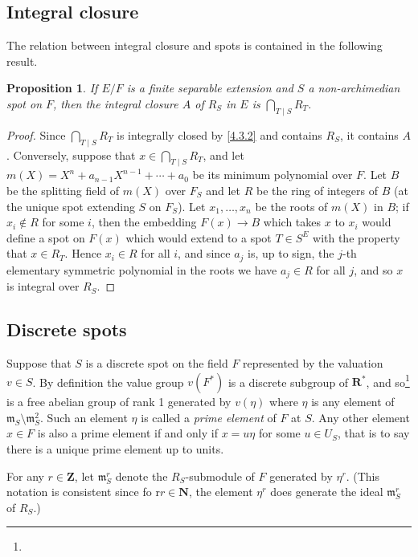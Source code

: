 \documentclass[10pt,leqno]{article}
\newtheorem{prop}[theo]{Proposition}
\theoremstyle{definition}
\def\NN{\mathbf{N}}
\def\ZZ{\mathbf{Z}}
\def\RR{\mathbf{R}}
\def\mm{\mathfrak{m}}
\def\fnfofi{}
\begin{document}
\subsection{Integral closure}
\label{ch:4.4}

The relation between integral closure and spots is contained in the following result.


\begin{prop}
\label{4.4.1}
If $E/F$ is a finite separable extension and $S$ a non-archi\-median spot on $F$, then the integral closure $A$ of $R_S$ in $E$ is $\bigcap_{T \mid S} R_T$.
\end{prop}

\begin{proof}
Since $\bigcap_{T \mid S} R_T$ is integrally closed by \ref{4.3.2} and contains $R_S$, it contains $A$.
Conversely, suppose that $x \in \bigcap_{T \mid S} R_T$, and let $m(X) = X^n + a_{n-1} X^{n-1} + \cdots + a_0$ be its minimum polynomial over $F$.
Let $B$ be the splitting field of $m(X)$ over $F_S$ and let $R$ be the ring of integers of $B$ (at the unique spot extending $S$ on $F_S$).
Let $x_1, \ldots, x_n$ be the roots of $m(X)$ in $B$; if $x_i \not\in R$ for some $i$, then the embedding $F(x) \to B$ which takes $x$ to $x_i$ would define a spot on $F(x)$ which would extend to a spot $T \in S^E$ with the property that $x \in R_T$.
Hence $x_i \in R$ for all $i$, and since $a_j$ is, up to sign, the $j$-th elementary symmetric polynomial in the roots we have $a_j \in R$ for all $j$, and so $x$ is integral over $R_S$.
\end{proof}


\subsection{Discrete spots}
\label{ch:4.5}

Suppose that $S$ is a discrete spot on the field $F$ represented by the valuation $v \in S$.
By definition the value group $v(F^*)$ is a discrete subgroup of $\RR^*$, and so\footnote{\fnfofi} is a free abelian group of rank 1 generated by $v(\eta)$ where $\eta$ is any element of $\mm_S \setminus \mm_S^2$.
Such an element $\eta$ is called a \emph{prime element} of $F$ at $S$.
Any other element $x \in F$ is also a prime element if and only if $x = u \eta$ for some $u \in U_S$, that is to say there is a unique prime element up to units.

For any $r \in \ZZ$, let $\mm_S^r$ denote the $R_S$-submodule of $F$ generated by $\eta^r$.
(This notation is consistent since fo r$r \in \NN$, the element $\eta^r$ does generate the ideal $\mm_S^r$ of $R_S$.)
\end{document}
